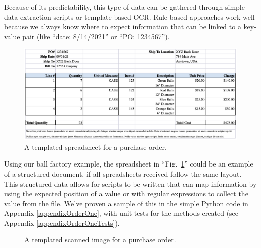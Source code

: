 \documentclass[conference]{IEEEtran}
\begin{document}
Because of its predictability, this type of data can be gathered through simple data extraction scripts or template-based OCR. Rule-based approaches work well because we always know where to expect information that can be linked to a key-value pair (like ``date: 8/14/2021'' or ``PO: 1234567'').

\begin{figure}[ht]
\centerline{\includegraphics[width=\columnwidth]{Spreadsheet1.png}}
\caption{A templated spreadsheet for a purchase order.}
\label{figSpreadsheet1}
\end{figure}

Using our ball factory example, the spreadsheet in ``Fig.~\ref{figSpreadsheet1}'' could be an example of a structured document, if all spreadsheets received follow the same layout. This structured data allows for scripts to be written that can map information by using the expected position of a value or with regular expressions to collect the value from the file. We've proven a sample of this in the simple Python code in Appendix \ref{appendixOrderOne}, with unit tests for the methods created (see Appendix \ref{appendixOrderOneTests}).

\begin{figure}[ht]
\centerline{
}
\caption{A templated scanned image for a purchase order.}
\label{figScanned1}
\end{figure}
\end{document}
